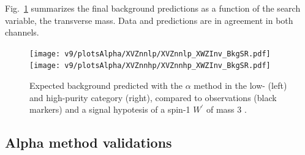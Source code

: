 





\noindent Fig.~\ref{fig:XVZnn_Exp} summarizes the final background predictions as a function of the search variable, the transverse mass. Data and predictions are in agreement in both channels. 

\begin{figure}[!htb]
  \centering
    \texttt{[image: v9/plotsAlpha/XVZnnlp/XVZnnlp\_XWZInv\_BkgSR.pdf]}
    \texttt{[image: v9/plotsAlpha/XVZnnhp/XVZnnhp\_XWZInv\_BkgSR.pdf]}
  \caption{Expected background predicted with the $\alpha$ method in the low- (left) and high-purity category (right), compared to observations (black markers) and a signal hypotesis of a spin-1 $W^{'}$ of mass 3 \TeV.}
  \label{fig:XVZnn_Exp}
\end{figure}


\subsection{Alpha method validations}
\label{ssec:alpha_validation}


